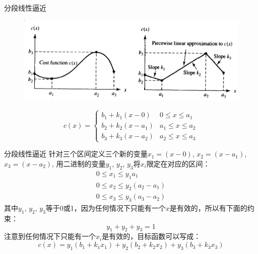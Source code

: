 \documentclass[mathserif, table]{beamer}
\begin{document}
\begin{frame}{分段线性逼近}

  \begin{figure}
    \centering
    \includegraphics[width=.8\textwidth{}]{linear.png}
  \end{figure}

  \[
  c(x) =
  \left\{
    \begin{array}{ll}
      b_1 + k_1(x-0) & 0 \le x \le a_1 \\
      b_2 + k_2(x-a_1) & a_1 \le x \le a_2 \\
      b_3 + k_3(x-a_2) & a_2 \le x \le a_3 
    \end{array}
  \right.
  \]
\end{frame}

\begin{frame}{分段线性逼近}
  针对三个区间定义三个新的变量$x_1 = (x-0)$, $x_2 = (x-a_1)$, $x_3 = (x-a_2)$, 用二进制的变量$y_1$, $y_2$, $y_3$将$x_i$限定在对应的区间：
  \[
  \left.
    \begin{array}{l}
      0 \le x_1 \le y_1a_1 \\
      0 \le x_2 \le y_2(a_2 - a_1) \\
      0 \le x_3 \le y_3(a_3 - a_2)
    \end{array}
  \right.
  \]
  其中$y_1$, $y_2$, $y_3$等于0或1，因为任何情况下只能有一个$x$是有效的，所以有下面的约束：
  \[
  y_1 + y_2 + y_3 = 1
  \]
  注意到任何情况下只能有一个$x_i$是有效的，目标函数可以写成：
  \[
  c(x) = y_1(b_1 + k_1x_1) + y_2(b_2 + k_2x_2) + y_3(b_3 + k_3x_3)
  \]
\end{frame}
\end{document}
